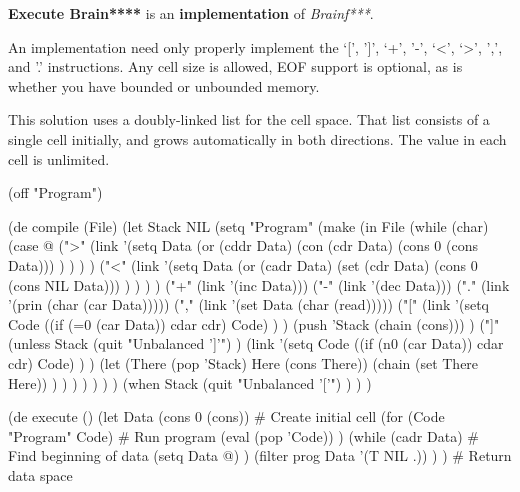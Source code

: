 \textbf{Execute Brain****} is an \textbf{implementation} of
\emph{Brainf***}. 

An implementation need only properly implement the `{[}', '{]}', `+',
'-', `\textless{}', `\textgreater{}', ',', and '.' instructions. Any
cell size is allowed, EOF support is optional, as is whether you have
bounded or unbounded memory.


\begin{wideverbatim}

This solution uses a doubly-linked list for the cell space. That list consists
of a single cell initially, and grows automatically in both directions. The
value in each cell is unlimited.

(off "Program")

(de compile (File)
   (let Stack NIL
      (setq "Program"
         (make
            (in File
               (while (char)
                  (case @
                     (">"
                        (link
                           '(setq Data
                              (or
                                 (cddr Data)
                                 (con (cdr Data) (cons 0 (cons Data))) ) ) ) )
                     ("<"
                        (link
                           '(setq Data
                              (or
                                 (cadr Data)
                                 (set (cdr Data) (cons 0 (cons NIL Data))) ) ) ) )
                     ("+" (link '(inc Data)))
                     ("-" (link '(dec Data)))
                     ("." (link '(prin (char (car Data)))))
                     ("," (link '(set Data (char (read)))))
                     ("["
                        (link
                           '(setq Code
                              ((if (=0 (car Data)) cdar cdr) Code) ) )
                        (push 'Stack (chain (cons))) )
                     ("]"
                        (unless Stack
                           (quit "Unbalanced ']'") )
                        (link
                           '(setq Code
                              ((if (n0 (car Data)) cdar cdr) Code) ) )
                        (let (There (pop 'Stack)  Here (cons There))
                           (chain (set There Here)) ) ) ) ) ) ) )
      (when Stack
         (quit "Unbalanced '['") ) ) )

(de execute ()
   (let Data (cons 0 (cons))              # Create initial cell
      (for (Code "Program"  Code)         # Run program
         (eval (pop 'Code)) )
      (while (cadr Data)                  # Find beginning of data
         (setq Data @) )
      (filter prog Data '(T NIL .)) ) )   # Return data space

\end{wideverbatim}

